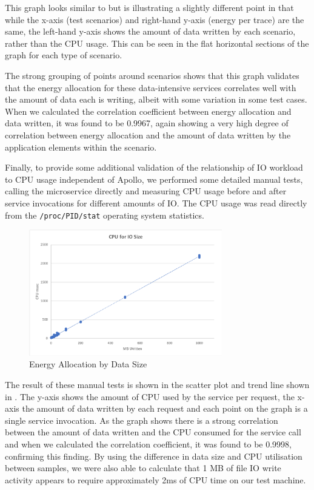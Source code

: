 This graph looks similar to  but is illustrating a slightly different point in that while the x-axis (test scenarios) and right-hand y-axis (energy per trace) are the same, the left-hand y-axis shows the amount of data written by each scenario, rather than the CPU usage.  This can be seen in the flat horizontal sections of the graph for each type of scenario.  

The strong grouping of points around scenarios shows that this graph validates that the energy allocation for these data-intensive services correlates well with the amount of data each is writing, albeit with some variation in some test cases. When we calculated the correlation coefficient between energy allocation and data written, it was found to be 0.9967, again showing a very high degree of correlation between energy allocation and the amount of data written by the application elements within the scenario.

Finally, to provide some additional validation of the relationship of IO workload to CPU usage independent of Apollo, we performed some detailed manual tests, calling the microservice directly and measuring CPU usage before and after service invocations for different amounts of IO.  The CPU usage was read directly from the \texttt{/proc/PID/stat} operating system statistics.

\begin{figure}
\centering
\includegraphics[width=0.75\textwidth,trim={3 2 2 2},clip]{Figures/validation-cpubydatasize}
\caption{Energy Allocation by Data Size}
\label{figure:validation-cpubydatasize}
\end{figure}

The result of these manual tests is shown in the scatter plot and trend line shown in .  The y-axis shows the amount of CPU used by the service per request, the x-axis the amount of data written by each request and each point on the graph is a single service invocation.  As the graph shows there is a strong correlation between the amount of data written and the CPU consumed for the service call and when we calculated the correlation coefficient, it was found to be 0.9998, confirming this finding.  By using the difference in data size and CPU utilisation between samples, we were also able to calculate that 1 MB of file IO write activity appears to require approximately 2ms of CPU time on our test machine.

